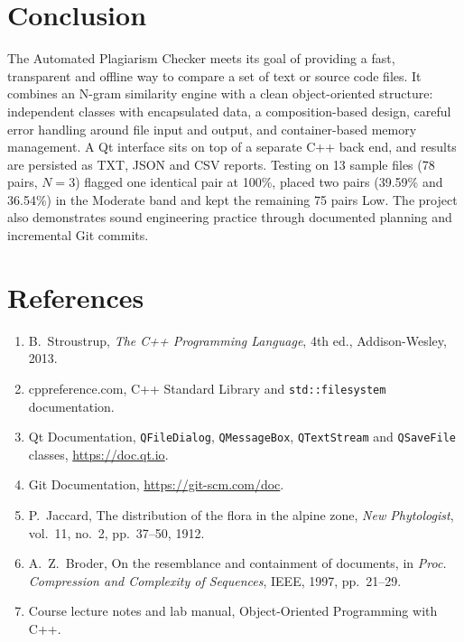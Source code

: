 \documentclass[11pt,a4paper]{report}
\newcommand{\cc}[1]{\texttt{#1}}
\begin{document}
\section{Conclusion}
The Automated Plagiarism Checker meets its goal of providing a fast, transparent and offline
way to compare a set of text or source code files. It combines an N-gram similarity engine
with a clean object-oriented structure: independent classes with encapsulated data, a
composition-based design, careful error handling around file input and output, and
container-based memory management. A Qt interface sits on top of a separate C++ back end,
and results are persisted as TXT, JSON and CSV reports. Testing on 13 sample files (78 pairs,
$N=3$) flagged one identical pair at 100\%, placed two pairs (39.59\% and 36.54\%) in the
Moderate band and kept the remaining 75 pairs Low. The project also demonstrates sound
engineering practice through documented planning and incremental Git commits.

\section{References}
\begin{enumerate}[nosep]
  \item B.~Stroustrup, \emph{The C++ Programming Language}, 4th ed., Addison-Wesley, 2013.
  \item cppreference.com, C++ Standard Library and \cc{std::filesystem} documentation.
  \item Qt Documentation, \cc{QFileDialog}, \cc{QMessageBox}, \cc{QTextStream} and
        \cc{QSaveFile} classes, \url{https://doc.qt.io}.
  \item Git Documentation, \url{https://git-scm.com/doc}.
  \item P.~Jaccard, The distribution of the flora in the alpine zone, \emph{New Phytologist},
        vol.~11, no.~2, pp.~37--50, 1912.
  \item A.~Z.~Broder, On the resemblance and containment of documents, in \emph{Proc.
        Compression and Complexity of Sequences}, IEEE, 1997, pp.~21--29.
  \item Course lecture notes and lab manual, Object-Oriented Programming with C++.
\end{enumerate}

\end{document}

